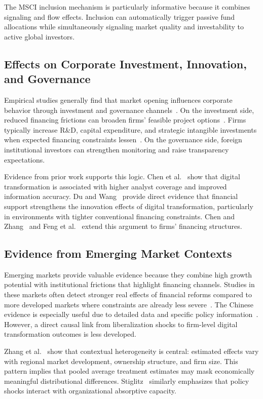 The MSCI inclusion mechanism is particularly informative because it combines signaling and flow effects. Inclusion can automatically trigger passive fund allocations while simultaneously signaling market quality and investability to active global investors.

\subsection{Effects on Corporate Investment, Innovation, and Governance}

Empirical studies generally find that market opening influences corporate behavior through investment and governance channels~\cite{Tian2023}. On the investment side, reduced financing frictions can broaden firms' feasible project options~\cite{RZhang2023}. Firms typically increase R\&D, capital expenditure, and strategic intangible investments when expected financing constraints lessen~\cite{Yin2023}. On the governance side, foreign institutional investors can strengthen monitoring and raise transparency expectations.

Evidence from prior work supports this logic. Chen et al.~\cite{Chen2022} show that digital transformation is associated with higher analyst coverage and improved information accuracy. Du and Wang~\cite{DuWang2024} provide direct evidence that financial support strengthens the innovation effects of digital transformation, particularly in environments with tighter conventional financing constraints. Chen and Zhang~\cite{ChenZhang2024} and Feng et al.~\cite{Feng2024} extend this argument to firms' financing structures.

\subsection{Evidence from Emerging Market Contexts}

Emerging markets provide valuable evidence because they combine high growth potential with institutional frictions that highlight financing channels. Studies in these markets often detect stronger real effects of financial reforms compared to more developed markets where constraints are already less severe~\cite{StiglitzOcampo2008}. The Chinese evidence is especially useful due to detailed data and specific policy information~\cite{Yan2023}. However, a direct causal link from liberalization shocks to firm-level digital transformation outcomes is less developed.

Zhang et al.~\cite{Zhang2024} show that contextual heterogeneity is central: estimated effects vary with regional market development, ownership structure, and firm size. This pattern implies that pooled average treatment estimates may mask economically meaningful distributional differences. Stiglitz~\cite{Stiglitz2000} similarly emphasizes that policy shocks interact with organizational absorptive capacity.

